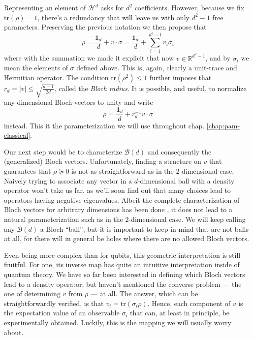		Representing an element of $\mathcal{H}^d$ asks for $d^2$ coefficients. However, because we fix $\text{tr}(\rho) = 1$, there's a redundancy that will leave us with only $d^2 - 1$ free parameters. Preserving the previous notation we then propose that
		\begin{equation*}
			\rho = \frac{\mathbf{1}_d}{d} + v \cdot \sigma = \frac{\mathbf{1}_d}{d} + \sum_{i = 1}^{d^2 - 1} v_i \sigma_i
			\label{eq:gell-mann-representation}
		\end{equation*}
		where with the summation we made it explicit that now $v \in \mathbb{R}^{d^2 - 1}$, and by $\sigma_i$ we mean the elements of $\sigma$ defined above. This is, again, clearly a unit-trace and Hermitian operator. The condition $\text{tr}(\rho^2) \leq 1$ further imposes that $r_d = \lvert v \rvert \leq \sqrt{\frac{d - 1}{2d}}$, called the \emph{Bloch radius}. It is possible, and useful, to normalize any-dimensional Bloch vectors to unity and write
		\begin{equation}
			\rho = \frac{\mathbf{1}_d}{d} + r_d^{-1} v \cdot \sigma
			\label{eq:normalized-bloch-vector-representation}
		\end{equation}
		instead. This it the parameterization we will use throughout chap. \ref{chap:pam-classical}.
	
		
		Our next step would be to characterize $\mathcal{B}(d)$ and consequently the (generalized) Bloch vectors. Unfortunately, finding a structure on $v$ that guarantees that $\rho \succeq 0$ is not as straightforward as in the $2$-dimensional case. Naively trying to associate any vector in a $d$-dimensional ball with a density operator won't take us far, as we'll soon find out that many choices lead to operators having negative eigenvalues. Albeit the complete characterization of Bloch vectors for arbitrary dimensions has been done \cite{kimura_2003_bloch}, it does not lead to a natural parameterization such as in the $2$-dimensional case. We will keep calling any $\mathcal{B}(d)$ a Bloch ``ball'', but it is important to keep in mind that are not balls at all, for there will in general be holes where there are no allowed Bloch vectors.

		Even being more complex than for qubits, this geometric interpretation is still fruitful. For one, its inverse map has quite an intuitive interpretation inside of quantum theory. We have so far been interested in defining which Bloch vectors lead to a density operator, but haven't mentioned the converse problem --- the one of determining $v$ from $\rho$ --- at all. The answer, which can be straightforwardly verified, is that $v_i = \text{tr}(\sigma_i \rho)$. Hence, each component of $v$ is the expectation value of an observable $\sigma_i$ that can, at least in principle, be experimentally obtained. Luckily, this is the mapping we will usually worry about.

